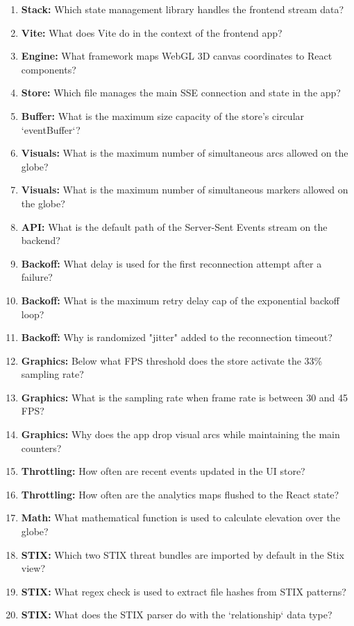 \documentclass[11pt,a4paper]{report}
\begin{document}
\begin{enumerate}
  \item \textbf{Stack:} Which state management library handles the frontend stream data?
  \item \textbf{Vite:} What does Vite do in the context of the frontend app?
  \item \textbf{Engine:} What framework maps WebGL 3D canvas coordinates to React components?
  \item \textbf{Store:} Which file manages the main SSE connection and state in the app?
  \item \textbf{Buffer:} What is the maximum size capacity of the store's circular `eventBuffer`?
  \item \textbf{Visuals:} What is the maximum number of simultaneous arcs allowed on the globe?
  \item \textbf{Visuals:} What is the maximum number of simultaneous markers allowed on the globe?
  \item \textbf{API:} What is the default path of the Server-Sent Events stream on the backend?
  \item \textbf{Backoff:} What delay is used for the first reconnection attempt after a failure?
  \item \textbf{Backoff:} What is the maximum retry delay cap of the exponential backoff loop?
  \item \textbf{Backoff:} Why is randomized "jitter" added to the reconnection timeout?
  \item \textbf{Graphics:} Below what FPS threshold does the store activate the 33\% sampling rate?
  \item \textbf{Graphics:} What is the sampling rate when frame rate is between 30 and 45 FPS?
  \item \textbf{Graphics:} Why does the app drop visual arcs while maintaining the main counters?
  \item \textbf{Throttling:} How often are recent events updated in the UI store?
  \item \textbf{Throttling:} How often are the analytics maps flushed to the React state?
  \item \textbf{Math:} What mathematical function is used to calculate elevation over the globe?
  \item \textbf{STIX:} Which two STIX threat bundles are imported by default in the Stix view?
  \item \textbf{STIX:} What regex check is used to extract file hashes from STIX patterns?
  \item \textbf{STIX:} What does the STIX parser do with the `relationship` data type?

\end{enumerate}
\end{document}
